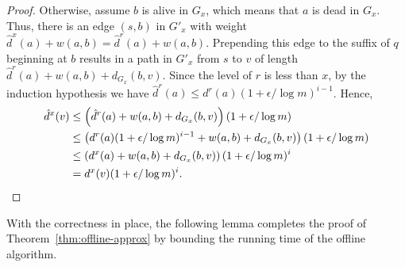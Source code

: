 \begin{proof}
    Otherwise, assume $b$ is alive in $G_x$, which means that $a$ is dead in $G_x$.
    Thus, there is an edge $(s,b)$ in $G'_x$ with weight $\hat{d}^x(a)+w(a,b)=\hat{d}^{r}(a) + w(a,b)$.
    Prepending this edge to the suffix of $q$ beginning at $b$ results in a path in $G'_x$ from $s$ to $v$ of length $\hat{d}^{r}(a) + w(a,b) + d_{G_x}(b,v)$. 
    Since the level of $r$ is less than $x$, 
    by the induction hypothesis we have $\hat{d}^{r}(a) \leq d^{r}(a)(1+\epsilon/\log m)^{i-1}$. 
    Hence, 
    \begin{align*}
      \hat{d}^x(v) &\leq  \left(\hat{d}^{r}(a) + w(a, b) + d_{G_x}(b, v)\right)(1 + \epsilon/\log m) \\ 
      &\leq \left(d^r(a)(1+\epsilon/\log m)^{i-1}+ w(a, b) + d_{G_x}(b, v)\right)(1 + \epsilon/\log m) \\
      &\leq \left(d^x(a) + w(a,b) + d_{G_x}(b, v)\right)(1 + \epsilon/\log m)^i \\
      &= d^x(v)(1 + \epsilon/\log m)^i. \qedhere
    \end{align*}
\end{proof}

With the correctness in place, the following lemma completes the proof of Theorem~\ref{thm:offline-approx} by bounding the running time of the offline algorithm. 

